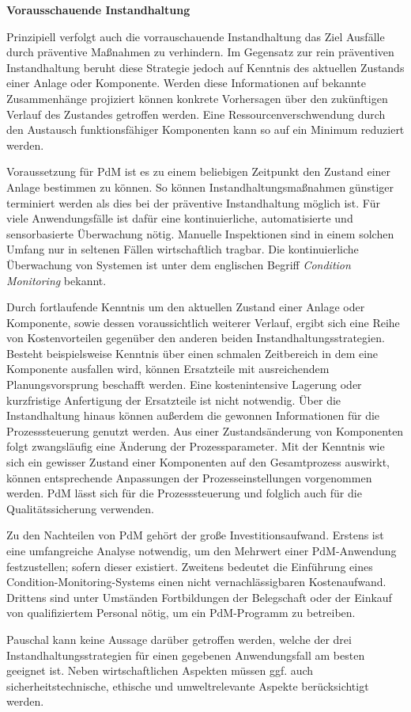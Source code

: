 \textbf{Vorausschauende Instandhaltung}

Prinzipiell verfolgt auch die vorrauschauende Instandhaltung das Ziel Ausfälle durch präventive Maßnahmen zu verhindern. Im Gegensatz zur rein präventiven Instandhaltung beruht diese Strategie jedoch auf Kenntnis des aktuellen Zustands einer Anlage oder Komponente. Werden diese Informationen auf bekannte Zusammenhänge projiziert können konkrete Vorhersagen über den zukünftigen Verlauf des Zustandes getroffen werden. Eine Ressourcenverschwendung durch den Austausch funktionsfähiger Komponenten kann so auf ein Minimum reduziert werden.

Voraussetzung für PdM ist es zu einem beliebigen Zeitpunkt den Zustand einer Anlage bestimmen zu können. So können Instandhaltungsmaßnahmen günstiger terminiert werden als dies bei der präventive Instandhaltung möglich ist. Für viele Anwendungsfälle ist dafür eine kontinuierliche, automatisierte und sensorbasierte Überwachung nötig. Manuelle Inspektionen sind in einem solchen Umfang nur in seltenen Fällen wirtschaftlich tragbar. Die kontinuierliche Überwachung von Systemen ist unter dem englischen Begriff \textit{Condition Monitoring} bekannt.

Durch fortlaufende Kenntnis um den aktuellen Zustand einer Anlage oder Komponente, sowie dessen voraussichtlich weiterer Verlauf, ergibt sich eine Reihe von Kostenvorteilen gegenüber den anderen beiden Instandhaltungsstrategien. Besteht beispielsweise Kenntnis über einen schmalen Zeitbereich in dem eine Komponente ausfallen wird, können Ersatzteile mit ausreichendem Planungsvorsprung beschafft werden. Eine kostenintensive Lagerung oder kurzfristige Anfertigung der Ersatzteile ist nicht notwendig. Über die Instandhaltung hinaus können außerdem die gewonnen Informationen für die Prozesssteuerung genutzt werden. Aus einer Zustandsänderung von Komponenten folgt zwangsläufig eine Änderung der Prozessparameter. Mit der Kenntnis wie sich ein gewisser Zustand einer Komponenten auf den Gesamtprozess auswirkt, können entsprechende Anpassungen der Prozesseinstellungen vorgenommen werden. PdM lässt sich für die Prozesssteuerung und folglich auch für die Qualitätssicherung verwenden.

Zu den Nachteilen von PdM gehört der große Investitionsaufwand. Erstens ist eine umfangreiche Analyse notwendig, um den Mehrwert einer PdM-Anwendung festzustellen; sofern dieser existiert. Zweitens bedeutet die Einführung eines Condition-Monitoring-Systems einen nicht vernachlässigbaren Kostenaufwand. Drittens sind unter Umständen Fortbildungen der Belegschaft oder der Einkauf von qualifiziertem Personal nötig, um ein PdM-Programm zu betreiben. 

Pauschal kann keine Aussage darüber getroffen werden, welche der drei Instandhaltungsstrategien für einen gegebenen Anwendungsfall am besten geeignet ist. Neben wirtschaftlichen Aspekten müssen ggf. auch sicherheitstechnische, ethische und umweltrelevante Aspekte berücksichtigt werden.